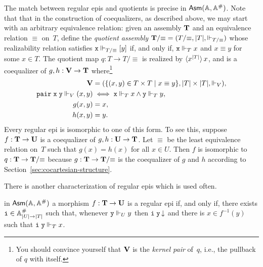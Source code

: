 The match between regular epis and quotients is precise in $\mathsf{Asm}(\mathbb{A},\mathbb{A}^{\#})$.
Note that that in the construction of coequalizers, as described
above, we may start with an arbitrary equivalence relation: given an
assembly $\mathbf{T}$ and an equivalence relation $\equiv$ on~$T$, define
the \emph{quotient assembly} $\mathbf{T}/{\equiv} = (T/{\equiv}, |T|,
\Vdash_{T/{\equiv}})$ whose realizability relation satisfies $\mathtt{x}
\Vdash_{T/{\equiv}} [y]$ if, and only if, $\mathtt{x} \Vdash_T x$ and $x \equiv
y$ for some $x \in T$. The quotient map $q : T \to T/{\equiv}$ is
realized by $\langle x^{|T|} \rangle\,x$, and is a coequalizer of $g,
h : \mathbf{V} \to \mathbf{T}$ where\footnote{You should convince yourself
  that $\mathbf{V}$ is the \emph{kernel pair} of~$q$, i.e., the pullback
  of $q$ with itself.}
%
\begin{align*}
  \mathbf{V} &= (\{(x,y) \in T \times T \mid x \equiv y\},
             |T| \times |T|, {\Vdash_V}),\\
  \mathtt{pair}\;\mathtt{x}\;\mathtt{y} \Vdash_V (x,y) &\iff
  \mathtt{x} \Vdash_T x \land \mathtt{y} \Vdash_T y, \\
  g (x, y) &= x,\\
  h (x, y) &= y.
\end{align*}
%
Every regular epi is isomorphic to one of this form. To see this,
suppose $f : \mathbf{T} \to \mathbf{U}$ is a coequalizer of $g, h : \mathbf{U}
\to \mathbf{T}$. Let $\equiv$ be the least equivalence relation on~$T$
such that $g(x) = h(x)$ for all $x \in U$. Then $f$ is isomorphic to
$q : \mathbf{T} \to \mathbf{T}/{\equiv}$ because $g : \mathbf{T} \to
\mathbf{T}/{\equiv}$ is the coequalizer of $g$ and $h$ according to
Section~\ref{sec:cocartesian-structure}.

There is another characterization of regular epis which is used often.

\begin{proposition}
  \label{prop:reg-epi-when}%
  in $\mathsf{Asm}(\mathbb{A},\mathbb{A}^{\#})$ a morphism $f : \mathbf{T} \to \mathbf{U}$ is a regular epi
  if, and only if, there exists $\mathtt{i} \in \mathbb{A}^{\#}_{|U| \to |T|}$
  such that, whenever $\mathtt{y} \Vdash_U y$ then $\mathtt{i}\;\mathtt{y}\,{\downarrow}$
  and there is $x \in f^{-1}(y)$ such that $\mathtt{i}\;\mathtt{y} \Vdash_T x$.
\end{proposition}

